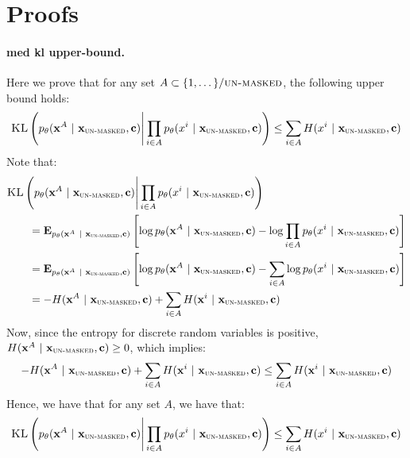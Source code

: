 \section{Proofs}\label{appsec:proofs}

\paragraph{\gls{med} \gls{kl} upper-bound.}
Here we prove that for any set $A \subset \{1, \dots\} / \textsc{un-masked}$, the following upper bound holds:
\begin{align}
    \textsc{KL}\left(p_\theta(\mathbf{x}^{A} ~\vert~ \mathbf{x}_\textsc{un-masked}, \mathbf{c}) \Bigg| \prod_{i\in A} p_\theta( x^i ~\vert~ \mathbf{x}_\textsc{un-masked}, \mathbf{c})\right) 
    \leq \sum_{i \in A} H(x^i ~\vert~ \mathbf{x}_\textsc{un-masked}, \mathbf{c})
\end{align}
Note that:
\begin{align}\nonumber
   & \textsc{KL}\left(p_\theta(\mathbf{x}^{A}  ~\vert~ \mathbf{x}_\textsc{un-masked}, \mathbf{c}) \Bigg| \prod_{i\in A} p_\theta( x^i ~\vert~ \mathbf{x}_\textsc{un-masked}, \mathbf{c})\right)  \\
    & \qquad = \mathbf{E}_{p_\theta(\mathbf{x}^{A} ~\vert~ \mathbf{x}_\textsc{un-masked}, \mathbf{c}) } \left[ \log p_\theta(\mathbf{x}^{A} ~\vert~ \mathbf{x}_\textsc{un-masked}, \mathbf{c})  - \log \prod_{i\in A} p_\theta(x^i ~\vert~ \mathbf{x}_\textsc{un-masked}, \mathbf{c}) \right]   \\ 
    & \qquad = \mathbf{E}_{p_\theta(\mathbf{x}^{A} ~\vert~ \mathbf{x}_\textsc{un-masked}, \mathbf{c}) } \left[ \log p_\theta(\mathbf{x}^{A} ~\vert~ \mathbf{x}_\textsc{un-masked}, \mathbf{c})  - \sum_{i\in A} \log p_\theta(x^i ~\vert~ \mathbf{x}_\textsc{un-masked}, \mathbf{c}) \right]   \\   \label{eq:kl_entropy}  
    & \qquad = -H(\mathbf{x}^{A} ~\vert~ \mathbf{x}_\textsc{un-masked}, \mathbf{c}) + \sum_{i \in A} H(\mathbf{x}^i ~\vert~ \mathbf{x}_\textsc{un-masked}, \mathbf{c}) 
\end{align}
Now, since the entropy for discrete random variables is positive, $H(\mathbf{x}^{A} ~\vert~ \mathbf{x}_\textsc{un-masked}, \mathbf{c}) \geq 0$, which implies:
\begin{align}
    -H(\mathbf{x}^{A} ~\vert~ \mathbf{x}_\textsc{un-masked}, \mathbf{c}) + \sum_{i \in A} H(\mathbf{x}^i ~\vert~ \mathbf{x}_\textsc{un-masked}, \mathbf{c}) \leq \sum_{i \in A} H(\mathbf{x}^i ~\vert~ \mathbf{x}_\textsc{un-masked}, \mathbf{c}) 
\end{align}
Hence, we have that for any set $A$, we have that: 
\begin{align}
    \textsc{KL}\left(p_\theta(\mathbf{x}^{A} ~\vert~ \mathbf{x}_\textsc{un-masked}, \mathbf{c}) \Bigg| \prod_{i\in A} p_\theta( x^i ~\vert~ \mathbf{x}_\textsc{un-masked}, \mathbf{c})\right) \leq \sum_{i \in A} H(x^i ~\vert~ \mathbf{x}_\textsc{un-masked}, \mathbf{c})
\end{align}

